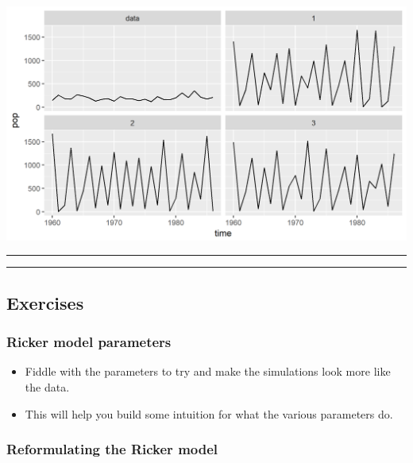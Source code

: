 \documentclass[]{article}
\begin{document}
\begin{center}\includegraphics{figure/intro-ricker-second-sim-1} \end{center}

\begin{center}\rule{0.5\linewidth}{\linethickness}\end{center}

\begin{center}\rule{0.5\linewidth}{\linethickness}\end{center}

\subsection{Exercises}\label{exercises}

\subsubsection{Ricker model parameters}\label{ricker-model-parameters}

\begin{itemize}
\item
  Fiddle with the parameters to try and make the simulations look more
  like the data.
\item
  This will help you build some intuition for what the various
  parameters do.
\end{itemize}

\subsubsection{Reformulating the Ricker
model}\label{reformulating-the-ricker-model}
\end{document}
